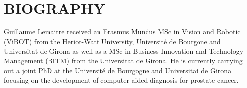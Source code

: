\section*{BIOGRAPHY}

Guillaume Lemaitre received an Erasmus Mundus MSc in Vision and Robotic (ViBOT) from the Heriot-Watt University, Universit\'e de Bourgone and Universitat de Girona as well as a MSc in Business Innovation and Technology Management (BITM) from the Universitat de Girona. He is currently carrying out a joint PhD at the Universit\'e de Bourgogne and Universitat de Girona focusing on the development of computer-aided diagnosis for prostate cancer. 

